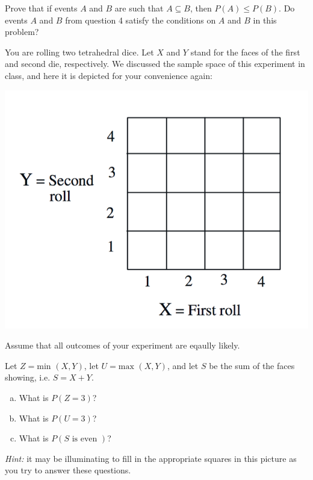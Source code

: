 \documentclass[12pt]{article}
\newenvironment{question}[2][Question]{\begin{trivlist}
\item[\hskip \labelsep {\bfseries #1}\hskip \labelsep {\bfseries #2.}]}{\end{trivlist}}
\begin{document}
\vspace{5mm}

 \begin{question}{6} Prove that if events $A$ and $B$ are such that $A \subseteq B$, then $P(A) \leq P(B)$. Do events $A$ and $B$ from question 4 satisfy the conditions on $A$ and $B$ in this problem? 
 \end{question} 
 
 \pagebreak
 \begin{question}{7} You are rolling two tetrahedral dice. Let $X$ and $Y$ stand for the faces of the first and second die, respectively. 
We discussed the sample space of this experiment in class, and here it is depicted for your convenience again:
\begin{center}
 \includegraphics[scale=0.30]{TetraDie}
 \end{center}

Assume that all outcomes of your experiment are eqaully likely. 
\vspace{3mm}

Let $Z = \text{min }(X, Y)$, let  $ U = \text{max }(X, Y)$, and let $S$ be the sum of the faces showing, i.e. $S = X + Y$.

\begin{enumerate}[(a)]
 \item What is $P(Z = 3)$?
\item What is $P(U = 3)$?
 \item What is $P(S \text{ is even })$?
 \end{enumerate}
  \textit{Hint:} it may be illuminating to fill in the appropriate squares in this picture as you try to answer these questions.
 \end{question} 
\end{document}
